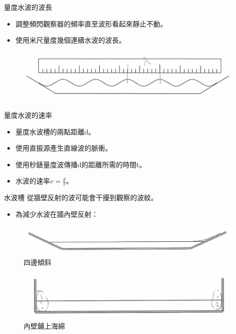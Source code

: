 \documentclass[13pt]{beamer}
\begin{document}
\begin{frame}{量度水波的波長}
    \begin{itemize}
        \item 調整頻閃觀察器的頻率直至波形看起來靜止不動。
        \item 使用米尺量度幾個連續水波的波長。
    \end{itemize}\bigskip
    \begin{figure}
        \centering
        \includegraphics[width=0.75\linewidth]{images/Screenshot 2023-09-26 at 10.12.41 PM.png}


    \end{figure}

\end{frame}

\begin{frame}{量度水波的速率}
    \begin{itemize}
        \item 量度水波槽的兩點距離d。
        \item 使用直振源產生直線波的脈衝。
        \item 使用秒錶量度波傳播d的距離所需的時間t。
        \item 水波的速率\(v=\frac{d}{t}\)。
    \end{itemize}\bigskip

\end{frame}

\begin{frame}{水波槽}
    從牆壁反射的波可能會干擾到觀察的波紋。
    \begin{itemize}
        \item 為減少水波在牆內壁反射：
    \end{itemize}
    \begin{figure}
        \centering
        \includegraphics[width=0.75\linewidth]{images/Screenshot 2023-09-26 at 10.23.04 PM.png}
        \caption{四邊傾斜}

    \end{figure}
    \begin{figure}
        \centering
        \includegraphics[width=0.7\linewidth]{images/Screenshot 2023-09-26 at 10.23.08 PM.png}
        \caption{內壁鋪上海綿}

    \end{figure}
\end{frame}
\end{document}
